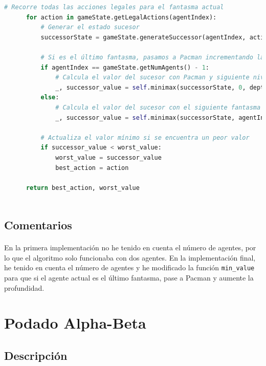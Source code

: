 \documentclass{report}
\begin{document}
\begin{lstlisting}[language=Python, caption=Implementación final del agente Minimax]
      # Recorre todas las acciones legales para el fantasma actual
      for action in gameState.getLegalActions(agentIndex):
          # Generar el estado sucesor
          successorState = gameState.generateSuccessor(agentIndex, action)
          
          # Si es el último fantasma, pasamos a Pacman incrementando la profundidad
          if agentIndex == gameState.getNumAgents() - 1:
              # Calcula el valor del sucesor con Pacman y siguiente nivel de profundidad
              _, successor_value = self.minimax(successorState, 0, depth + 1)
          else:
              # Calcula el valor del sucesor con el siguiente fantasma
              _, successor_value = self.minimax(successorState, agentIndex + 1, depth)

          # Actualiza el valor mínimo si se encuentra un peor valor
          if successor_value < worst_value:
              worst_value = successor_value
              best_action = action

      return best_action, worst_value
        
          \end{lstlisting}
        \subsection*{Comentarios}
          \paragraph*{}{
            En la primera implementación no he tenido en cuenta el número de agentes, por lo que el algoritmo solo funcionaba con dos agentes. En la implementación final, he tenido en cuenta el número de agentes y he modificado la función \texttt{min\_value} para que si el agente actual es el último fantasma, pase a Pacman y aumente la profundidad.
          }
      \clearpage\section{Podado Alpha-Beta} %
        \subsection*{Descripción}
\end{document}
